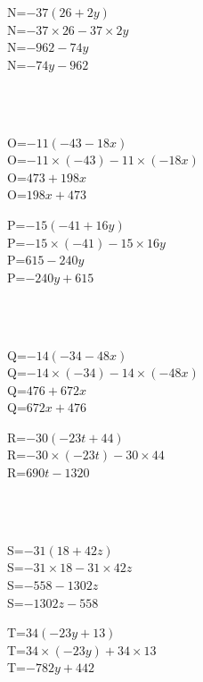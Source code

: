 \documentclass{article}%
\begin{document}
\begin{minipage}{0.5\textwidth}%
N=$-37(26+2y)$\\%
N=$-37 \times 26-37 \times 2y$\\%
N=$-962-74y$\\%
N=$-74y-962$\\%
\end{minipage}%
\\%
\\%
\begin{minipage}{0.5\textwidth}%
O=$-11(-43-18x)$\\%
O=$-11 \times (-43)-11 \times (-18x)$\\%
O=$473+198x$\\%
O=$198x+473$\\%
\end{minipage}%
\begin{minipage}{0.5\textwidth}%
P=$-15(-41+16y)$\\%
P=$-15 \times (-41)-15 \times 16y$\\%
P=$615-240y$\\%
P=$-240y+615$\\%
\end{minipage}%
\\%
\\%
\begin{minipage}{0.5\textwidth}%
Q=$-14(-34-48x)$\\%
Q=$-14 \times (-34)-14 \times (-48x)$\\%
Q=$476+672x$\\%
Q=$672x+476$\\%
\end{minipage}%
\begin{minipage}{0.5\textwidth}%
R=$-30(-23t+44)$\\%
R=$-30 \times (-23t)-30 \times 44$\\%
R=$690t-1320$\\%
\end{minipage}%
\\%
\\%
\begin{minipage}{0.5\textwidth}%
S=$-31(18+42z)$\\%
S=$-31 \times 18-31 \times 42z$\\%
S=$-558-1302z$\\%
S=$-1302z-558$\\%
\end{minipage}%
\begin{minipage}{0.5\textwidth}%
T=$34(-23y+13)$\\%
T=$34 \times (-23y)+34 \times 13$\\%
T=$-782y+442$\\%
\end{minipage}%
\\%
\\

%
\end{document}
